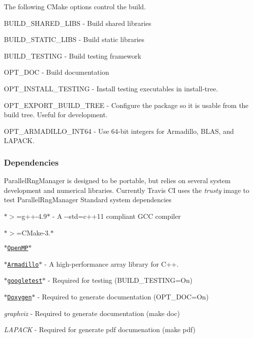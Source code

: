 The following C\-Make options control the build.
\begin{DoxyItemize}
\item {\ttfamily B\-U\-I\-L\-D\-\_\-\-S\-H\-A\-R\-E\-D\-\_\-\-L\-I\-B\-S} -\/ Build shared libraries
\item {\ttfamily B\-U\-I\-L\-D\-\_\-\-S\-T\-A\-T\-I\-C\-\_\-\-L\-I\-B\-S} -\/ Build static libraries
\item {\ttfamily B\-U\-I\-L\-D\-\_\-\-T\-E\-S\-T\-I\-N\-G} -\/ Build testing framework
\item {\ttfamily O\-P\-T\-\_\-\-D\-O\-C} -\/ Build documentation
\item {\ttfamily O\-P\-T\-\_\-\-I\-N\-S\-T\-A\-L\-L\-\_\-\-T\-E\-S\-T\-I\-N\-G} -\/ Install testing executables in install-\/tree.
\item {\ttfamily O\-P\-T\-\_\-\-E\-X\-P\-O\-R\-T\-\_\-\-B\-U\-I\-L\-D\-\_\-\-T\-R\-E\-E} -\/ Configure the package so it is usable from the build tree. Useful for development.
\item {\ttfamily O\-P\-T\-\_\-\-A\-R\-M\-A\-D\-I\-L\-L\-O\-\_\-\-I\-N\-T64} -\/ Use 64-\/bit integers for Armadillo, B\-L\-A\-S, and L\-A\-P\-A\-C\-K.
\end{DoxyItemize}

\subsubsection*{Dependencies}

Parallel\-Rng\-Manager is designed to be portable, but relies on several system development and numerical libraries. Currently Travis C\-I uses the {\itshape trusty} image to test Parallel\-Rng\-Manager Standard system dependencies
\begin{DoxyItemize}
\item $\ast$$>$=g++-\/4.9$\ast$ -\/ A {\ttfamily -\/-\/std=c++11} compliant G\-C\-C compiler
\item $\ast$$>$=C\-Make-\/3.$\ast$
\item \href{https://www.openmp.org/}{\tt $\ast$\-Open\-M\-P$\ast$}
\item \href{http://arma.sourceforge.net/docs.html}{\tt $\ast$\-Armadillo$\ast$} -\/ A high-\/performance array library for C++.
\item \href{https://github.com/google/googletest}{\tt $\ast$googletest$\ast$} -\/ Required for testing ({\ttfamily B\-U\-I\-L\-D\-\_\-\-T\-E\-S\-T\-I\-N\-G=On})
\item \href{https://github.com/google/googletest}{\tt $\ast$\-Doxygen$\ast$} -\/ Required to generate documentation ({\ttfamily O\-P\-T\-\_\-\-D\-O\-C=On})
\begin{DoxyItemize}
\item {\itshape graphviz} -\/ Required to generate documentation ({\ttfamily make doc})
\item {\itshape L\-A\-P\-A\-C\-K} -\/ Required for generate pdf documenation ({\ttfamily make pdf})
\end{DoxyItemize}
\end{DoxyItemize}

